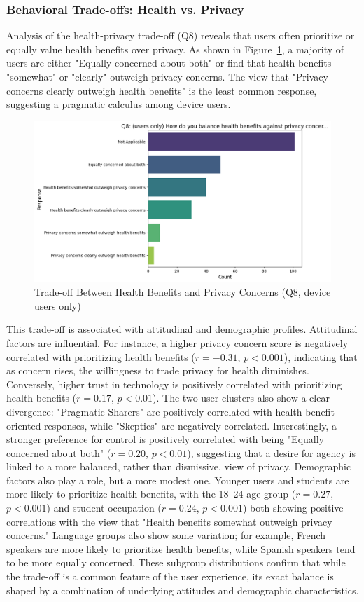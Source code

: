 	\subsubsection{Behavioral Trade-offs: Health vs. Privacy}
	Analysis of the health-privacy trade-off (Q8) reveals that users often prioritize or equally value health benefits over privacy. As shown in Figure~\ref{fig:Q8_tradeoff}, a majority of users are either "Equally concerned about both" or find that health benefits "somewhat" or "clearly" outweigh privacy concerns. The view that "Privacy concerns clearly outweigh health benefits" is the least common response, suggesting a pragmatic calculus among device users.
	\begin{figure}[ht]\centering
		\includegraphics[width=0.7\linewidth]{figures/questions/Q8_single_choice.png}
		\caption{Trade-off Between Health Benefits and Privacy Concerns (Q8, device users only)}
		\label{fig:Q8_tradeoff}
	\end{figure}
	This trade-off is associated with attitudinal and demographic profiles. Attitudinal factors are influential. For instance, a higher privacy concern score is negatively correlated with prioritizing health benefits ($r = -0.31$, $p < 0.001$), indicating that as concern rises, the willingness to trade privacy for health diminishes. Conversely, higher trust in technology is positively correlated with prioritizing health benefits ($r = 0.17$, $p < 0.01$). The two user clusters also show a clear divergence: "Pragmatic Sharers" are positively correlated with health-benefit-oriented responses, while "Skeptics" are negatively correlated. Interestingly, a stronger preference for control is positively correlated with being "Equally concerned about both" ($r = 0.20$, $p < 0.01$), suggesting that a desire for agency is linked to a more balanced, rather than dismissive, view of privacy.
	Demographic factors also play a role, but a more modest one. Younger users and students are more likely to prioritize health benefits, with the 18--24 age group ($r = 0.27$, $p < 0.001$) and student occupation ($r = 0.24$, $p < 0.001$) both showing positive correlations with the view that "Health benefits somewhat outweigh privacy concerns." Language groups also show some variation; for example, French speakers are more likely to prioritize health benefits, while Spanish speakers tend to be more equally concerned. These subgroup distributions confirm that while the trade-off is a common feature of the user experience, its exact balance is shaped by a combination of underlying attitudes and demographic characteristics.
